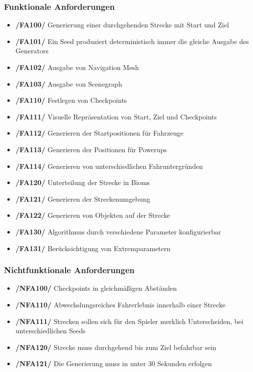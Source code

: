 \documentclass[parskip=full]{scrartcl}
\begin{document}
	\subsubsection{Funktionale Anforderungen}
	\begin{itemize} [label={}]
		\item \textbf{/FA100/} Generierung einer durchgehenden Strecke mit Start und Ziel
		\item \textbf{/FA101/} Ein \gls{Seed} produziert deterministisch immer die gleiche Ausgabe des Generators
		\item \textbf{/FA102/} Ausgabe von \gls{Navigation Mesh}
		\item \textbf{/FA103/} Ausgabe von \gls{Scenegraph}
		
		\item \textbf{/FA110/} Festlegen von Checkpoints
		\item \textbf{/FA111/} Visuelle Repräsentation von Start, Ziel und Checkpoints
		\item \textbf{/FA112/} Generieren der Startpositionen für Fahrzeuge
		\item \textbf{/FA113/} Generieren der Positionen für Powerups
		\item \textbf{/FA114/} Generieren von unterschiedlichen Fahruntergründen
		
		\item \textbf{/FA120/} Unterteilung der Strecke in \glspl{Biom}
		\item \textbf{/FA121/} Generieren der Streckenumgebung
		\item \textbf{/FA122/} Generieren von Objekten auf der Strecke
		
		\item \textbf{/FA130/} Algorithmus durch verschiedene Parameter konfigurierbar
		\item \textbf{/FA131/} Berücksichtigung von Extremparametern
	\end{itemize}
	
	\subsubsection{Nichtfunktionale Anforderungen}
	\begin{itemize} [label={}]
		\item \textbf{/NFA100/} Checkpoints in gleichmäßigen Abständen
		
		\item \textbf{/NFA110/} Abwechslungsreiches Fahrerlebnis innerhalb einer Strecke
		\item \textbf{/NFA111/} Strecken sollen sich für den Spieler merklich Unterscheiden, bei unterschiedlichen \glspl{Seed}
		
		\item \textbf{/NFA120/} Strecke muss durchgehend bis zum Ziel befahrbar sein
		\item \textbf{/NFA121/} Die Generierung muss in unter 30 Sekunden erfolgen
	\end{itemize}
		
\end{document}
